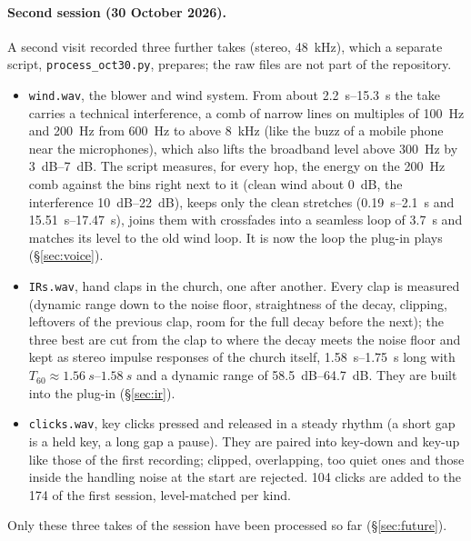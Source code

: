 \documentclass[11pt,a4paper,parskip=half,DIV=11,toc=bibliography]{scrartcl}
\newcommand{\fn}[1]{\mbox{\texttt{#1}}}
\begin{document}
\paragraph{Second session (30 October 2026).} A second visit recorded three further takes (stereo, \SI{48}{kHz}), which a
separate script, \fn{process\_oct30.py}, prepares; the raw files are not part of the repository.
\begin{itemize}
  \item \fn{wind.wav}, the blower and wind system. From about \SIrange{2.2}{15.3}{s} the take carries a technical
        interference, a comb of narrow lines on multiples of \SI{100}{Hz} and \SI{200}{Hz} from \SI{600}{Hz} to above \SI{8}{kHz}
        (like the buzz of a mobile phone near the microphones), which also lifts the broadband level above \SI{300}{Hz} by
        \SIrange{3}{7}{dB}. The script measures, for every hop, the energy on the \SI{200}{Hz} comb against the bins right next
        to it (clean wind about \SI{0}{dB}, the interference \SIrange{10}{22}{dB}), keeps only the clean stretches
        (\SIrange{0.19}{2.1}{s} and \SIrange{15.51}{17.47}{s}), joins them with crossfades into a seamless loop of \SI{3.7}{s}
        and matches its level to the old wind loop. It is now the loop the plug-in plays (\S\ref{sec:voice}).
  \item \fn{IRs.wav}, hand claps in the church, one after another. Every clap is measured (dynamic range down to the noise
        floor, straightness of the decay, clipping, leftovers of the previous clap, room for the full decay before the next);
        the three best are cut from the clap to where the decay meets the noise floor and kept as stereo impulse responses
        of the church itself, \SIrange{1.58}{1.75}{s} long with $T_{60}\approx\SIrange{1.56}{1.58}{s}$ and a dynamic range of
        \SIrange{58.5}{64.7}{dB}. They are built into the plug-in (\S\ref{sec:ir}).
  \item \fn{clicks.wav}, key clicks pressed and released in a steady rhythm (a short gap is a held key, a long gap a pause).
        They are paired into key-down and key-up like those of the first recording; clipped, overlapping, too quiet ones and
        those inside the handling noise at the start are rejected. 104 clicks are added to the 174 of the first session,
        level-matched per kind.
\end{itemize}
Only these three takes of the session have been processed so far (\S\ref{sec:future}).

\end{document}
